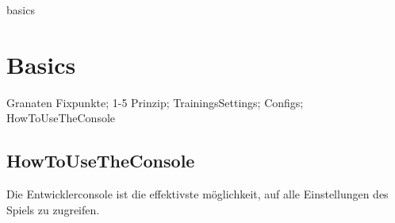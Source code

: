 \newpage



basics

\chapter{Basics}
\label{chap:basics}
Granaten Fixpunkte; 1-5 Prinzip; TrainingsSettings; Configs; HowToUseTheConsole

\section{HowToUseTheConsole}
\label{sect:console}
Die Entwicklerconsole ist die effektivste möglichkeit, auf alle Einstellungen des Spiels zu zugreifen.